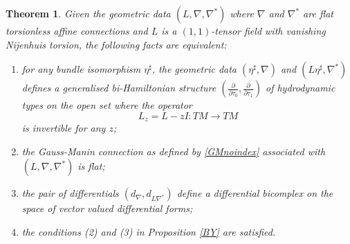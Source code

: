 \documentclass[11pt,a4paper]{amsart}
\numberwithin{equation}{section}
\newtheorem{theorem}{Theorem}[section]
\newcommand{\diff}[2]{\frac{\partial #1}{\partial #2}}
\newcommand{\qt}{\tau}
\numberwithin{equation}{section}
\begin{document}
\begin{theorem}
Given the geometric data $(L,\nabla,\nabla^*)$ where $\nabla$ and $\nabla^*$ are flat torsionless affine connections and $L$ is a $(1,1)$-tensor field with vanishing Nijenhuis torsion, the  following facts are equivalent:
\begin{enumerate}
\item for any bundle isomorphism $\eta^\sharp$, the geometric data $(\eta^\sharp,\nabla)$ and $(L\eta^\sharp,\nabla^*)$ defines a generalised bi-Hamiltonian structure $(\diff{}{\qt_0},\diff{}{\qt_1})$  of hydrodynamic types on the open set where the operator 
  \[
  L_z = L-z I\colon TM\to TM 
  \]
  is invertible for any $z$; 
  \item the Gauss-Manin connection as defined by \eqref{GMnoindex} associated with  $(L,\nabla,\nabla^*)$ is flat;
  \item the pair of  differentials $(d_{\nabla},d_{L\nabla^*})$ define a differential bicomplex on the space of vector valued differential  forms;
  \item the conditions (2) and (3) in Proposition \ref{BY} are satisfied.
\end{enumerate}
\end{theorem}
\end{document}
